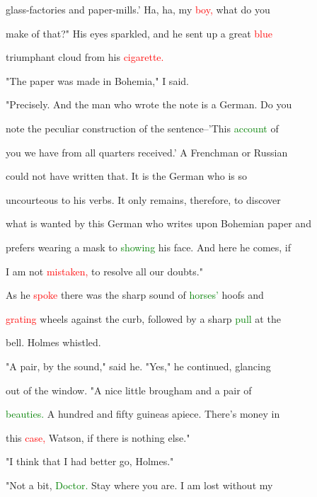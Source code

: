  glass-factories and paper-mills.' Ha, ha, my \textcolor{red}{boy,} what do you

 make of that?" His eyes \textcolor{BurntOrange}{sparkled,} and he sent up a great \textcolor{red}{blue}

 \textcolor{BurntOrange}{triumphant} cloud from his \textcolor{red}{cigarette.}



 "The paper was made in Bohemia," I said.



 "Precisely. And the man who wrote the note is a German. Do you

 note the peculiar construction of the sentence--'This \textcolor{green}{account} of

 you we have from all quarters received.' A Frenchman or Russian

 could not have written that. It is the German who is so

 uncourteous to his verbs. It only \textcolor{BurntOrange}{remains,} therefore, to discover

 what is wanted by this German who writes upon Bohemian paper and

 prefers \textcolor{BurntOrange}{wearing} a mask to \textcolor{green}{showing} his face. And here he comes, if

 I am not \textcolor{red}{mistaken,} to resolve all our \textcolor{BurntOrange}{doubts."}



 As he \textcolor{red}{spoke} there was the sharp sound of \textcolor{green}{horses'} hoofs and

 \textcolor{red}{grating} wheels against the curb, followed by a sharp \textcolor{green}{pull} at the

 bell. Holmes whistled.



 "A pair, by the sound," said he. "Yes," he continued, glancing

 out of the window. "A nice little brougham and a pair of

 \textcolor{green}{beauties.} A hundred and fifty guineas apiece. There's \textcolor{BurntOrange}{money} in

 this \textcolor{red}{case,} Watson, if there is nothing else."



 "I think that I had better go, Holmes."



 "Not a bit, \textcolor{green}{Doctor.} Stay where you are. I am \textcolor{BurntOrange}{lost} without my

